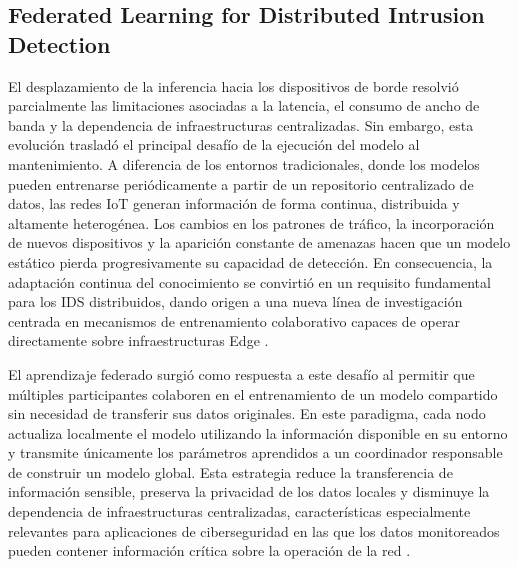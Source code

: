 \documentclass[journal,article,submit,moreauthors]{Definitions/mdpi}
\begin{document}
\subsection{Federated Learning for Distributed Intrusion Detection}
El desplazamiento de la inferencia hacia los dispositivos de borde resolvió parcialmente las limitaciones asociadas a la latencia, el consumo de ancho de banda y la dependencia de infraestructuras centralizadas. Sin embargo, esta evolución trasladó el principal desafío de la ejecución del modelo al mantenimiento. A diferencia de los entornos tradicionales, donde los modelos pueden entrenarse periódicamente a partir de un repositorio centralizado de datos, las redes IoT generan información de forma continua, distribuida y altamente heterogénea. Los cambios en los patrones de tráfico, la incorporación de nuevos dispositivos y la aparición constante de amenazas hacen que un modelo estático pierda progresivamente su capacidad de detección. En consecuencia, la adaptación continua del conocimiento se convirtió en un requisito fundamental para los IDS distribuidos, dando origen a una nueva línea de investigación centrada en mecanismos de entrenamiento colaborativo capaces de operar directamente sobre infraestructuras Edge \cite{McMahan2017,Imteaj2022,Ramadan2025}.
%

El aprendizaje federado surgió como respuesta a este desafío al permitir que múltiples participantes colaboren en el entrenamiento de un modelo compartido sin necesidad de transferir sus datos originales. En este paradigma, cada nodo actualiza localmente el modelo utilizando la información disponible en su entorno y transmite únicamente los parámetros aprendidos a un coordinador responsable de construir un modelo global. Esta estrategia reduce la transferencia de información sensible, preserva la privacidad de los datos locales y disminuye la dependencia de infraestructuras centralizadas, características especialmente relevantes para aplicaciones de ciberseguridad en las que los datos monitoreados pueden contener información crítica sobre la operación de la red \cite{McMahan2017,Imteaj2022,Hajj2023,Roy2023}.
\end{document}
